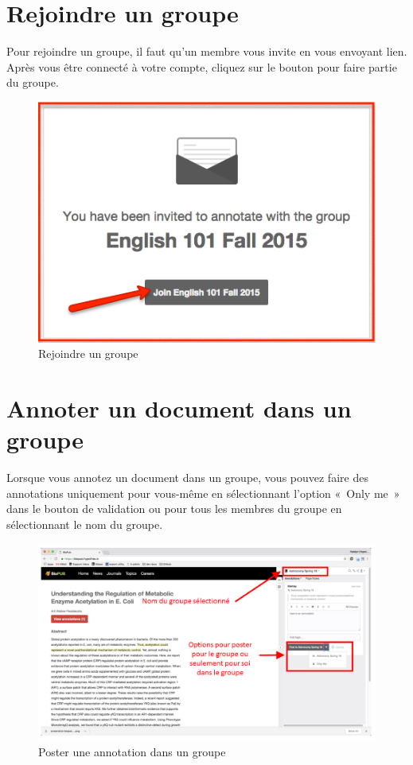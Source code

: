 \documentclass[
]{book}
\begin{document}
\hypertarget{s63}{%
\section{Rejoindre un groupe}\label{s63}}

Pour rejoindre un groupe, il faut qu'un membre vous invite en vous envoyant lien. Après vous être connecté à votre compte, cliquez sur le bouton pour faire partie du groupe.

\begin{figure}
\centering
\includegraphics{img/3c43f5853bd5bc770efb60d74686f1ae.png}
\caption{Rejoindre un groupe}
\end{figure}

\hypertarget{s64}{%
\section{Annoter un document dans un groupe}\label{s64}}

Lorsque vous annotez un document dans un groupe, vous pouvez faire des annotations uniquement pour vous-même en sélectionnant l'option «~Only me~» dans le bouton de validation ou pour tous les membres du groupe en sélectionnant le nom du groupe.

\begin{figure}
\centering
\includegraphics{img/postGroup.png}
\caption{Poster une annotation dans un groupe}
\end{figure}
\end{document}
